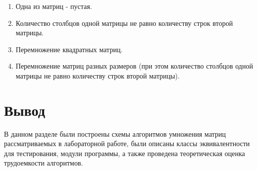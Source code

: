 \begin{enumerate}[label=\arabic*)]
	\item Одна из матриц - пустая.
	\item Количество столбцов одной матрицы не равно количеству строк второй матрицы.
	\item Перемножение квадратных матриц.
	\item Перемножение матриц разных размеров (при этом количество столбцов одной матрицы не равно количеству строк второй матрицы).
\end{enumerate}


\section{Вывод}

В данном разделе были построены схемы алгоритмов умножения матриц рассматриваемых в лабораторной работе, были описаны классы эквивалентности для тестирования, модули программы, а также проведена теоретическая оценка трудоемкости алгоритмов.
